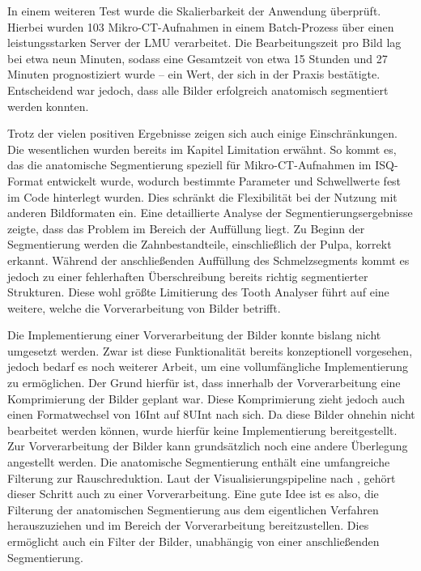 In einem weiteren Test wurde die Skalierbarkeit der Anwendung überprüft. Hierbei
wurden 103 Mikro-\ac{CT}-Aufnahmen in einem Batch-Prozess über einen
leistungsstarken Server der LMU verarbeitet. Die Bearbeitungszeit pro Bild lag bei
etwa neun Minuten, sodass eine Gesamtzeit von etwa 15 Stunden und 27 Minuten
prognostiziert wurde – ein Wert, der sich in der Praxis bestätigte. Entscheidend
war jedoch, dass alle Bilder erfolgreich anatomisch segmentiert werden konnten.

Trotz der vielen positiven Ergebnisse zeigen sich auch einige Einschränkungen.
Die wesentlichen wurden bereits im Kapitel Limitation erwähnt. So kommt es, das
die anatomische Segmentierung speziell für Mikro-\ac{CT}-Aufnahmen im \ac{ISQ}-Format
entwickelt wurde, wodurch bestimmte Parameter und Schwellwerte fest im Code hinterlegt
wurden. Dies schränkt die Flexibilität bei der Nutzung mit anderen Bildformaten
ein. Eine detaillierte Analyse der Segmentierungsergebnisse zeigte, dass das
Problem im Bereich der Auffüllung liegt. Zu Beginn der Segmentierung werden die Zahnbestandteile,
einschließlich der Pulpa, korrekt erkannt. Während der anschließenden Auffüllung
des Schmelzsegments kommt es jedoch zu einer fehlerhaften Überschreibung bereits
richtig segmentierter Strukturen. Diese wohl größte Limitierung des Tooth Analyser
führt auf eine weitere, welche die Vorverarbeitung von Bilder betrifft.

Die Implementierung einer Vorverarbeitung der Bilder konnte bislang nicht
umgesetzt werden. Zwar ist diese Funktionalität bereits konzeptionell vorgesehen,
jedoch bedarf es noch weiterer Arbeit, um eine vollumfängliche Implementierung zu
ermöglichen. Der Grund hierfür ist, dass innerhalb der Vorverarbeitung eine Komprimierung
der Bilder geplant war. Diese Komprimierung zieht jedoch auch einen
Formatwechsel von \ac{16Int} auf \ac{8UInt} nach sich. Da diese Bilder ohnehin nicht
bearbeitet werden können, wurde hierfür keine Implementierung bereitgestellt. Zur
Vorverarbeitung der Bilder kann grundsätzlich noch eine andere Überlegung angestellt
werden. Die anatomische Segmentierung enthält eine umfangreiche Filterung zur
Rauschreduktion. Laut der Visualisierungspipeline nach \citet[S.~50]{handels2000},
gehört dieser Schritt auch zu einer Vorverarbeitung. Eine gute Idee ist es also,
die Filterung der anatomischen Segmentierung aus dem eigentlichen Verfahren herauszuziehen
und im Bereich der Vorverarbeitung bereitzustellen. Dies ermöglicht auch ein
Filter der Bilder, unabhängig von einer anschließenden Segmentierung.

